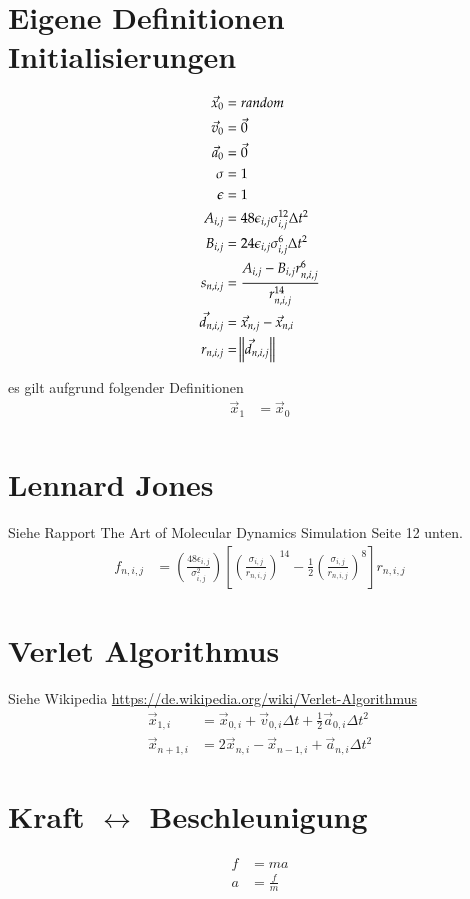 \documentclass{article}
\begin{document}
\section*{Eigene Definitionen Initialisierungen}
\begin{align}
\vec{x}_0&=random\\
	\vec{v}_0&=\vec{0}\\
	\vec{a}_0&=\vec{0}\\
	\sigma&=1\\
	\epsilon&=1\\
	A_{i,j}&=48\epsilon_{i,j}\sigma_{i,j}^{12}\Delta t^2\\
	B_{i,j}&=24\epsilon_{i,j}\sigma_{i,j}^{6}\Delta t^2\\
	s_{n,i,j}&=\frac{A_{i,j}-B_{i,j}r_{n,i,j}^6}{r_{n,i,j}^{14}}\\
	\vec{d}_{n,i,j}&=\vec{x}_{n,j}-\vec{x}_{n,i}\\
	r_{n,i,j}&=\norm{\vec{d}_{n,i,j}}\\
\end{align}

es gilt aufgrund folgender Definitionen
\begin{align}
	\vec{x}_1&=\vec{x}_0\\
\end{align}


\section*{Lennard Jones}
Siehe Rapport The Art of Molecular Dynamics Simulation Seite 12 unten.\\
\begin{align*}
	f_{n,i,j}&=\left(\frac{48\epsilon_{i,j}}{\sigma_{i,j}^2}\right)\left[\left(\frac{\sigma_{i,j}}{r_{n,i,j}}\right)^{14}-\frac{1}{2}\left(\frac{\sigma_{i,j}}{r_{n,i,j}}\right)^8\right]r_{n,i,j}
\end{align*}
\section*{Verlet Algorithmus}
Siehe Wikipedia \url{https://de.wikipedia.org/wiki/Verlet-Algorithmus}\\
\begin{align*}
	\vec{x}_{1,i}&=\vec{x}_{0,i}+\vec{v}_{0,i}\Delta t+\frac{1}{2}\vec{a}_{0,i}\Delta t^2\\
	\vec{x}_{n+1,i}&=2\vec{x}_{n,i}-\vec{x}_{n-1,i}+\vec{a}_{n,i}\Delta t^2
\end{align*}
\section*{Kraft $\leftrightarrow$ Beschleunigung}
\begin{align*}
	f&=ma\\
	a&=\frac{f}{m}
\end{align*}
\end{document}
